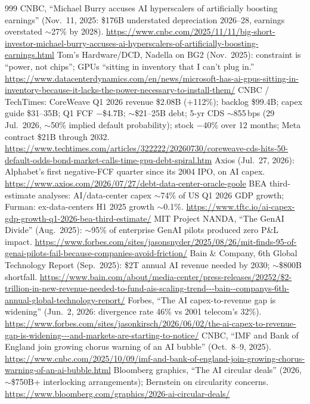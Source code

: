 \begin{thebibliography}{999}
 CNBC, ``Michael Burry accuses AI hyperscalers of artificially boosting earnings'' (Nov.\ 11, 2025: \$176B understated depreciation 2026--28, earnings overstated $\sim$27\% by 2028). \url{https://www.cnbc.com/2025/11/11/big-short-investor-michael-burry-accuses-ai-hyperscalers-of-artificially-boosting-earnings.html}
 Tom's Hardware/DCD, Nadella on BG2 (Nov.\ 2025): constraint is ``power, not chips''; GPUs ``sitting in inventory that I can't plug in.'' \url{https://www.datacenterdynamics.com/en/news/microsoft-has-ai-gpus-sitting-in-inventory-because-it-lacks-the-power-necessary-to-install-them/}
 CNBC / TechTimes: CoreWeave Q1 2026 revenue \$2.08B ($+$112\%); backlog \$99.4B; capex guide \$31--35B; Q1 FCF $-$\$4.7B; $\sim$\$21--25B debt; 5-yr CDS $\sim$855\,bps (29 Jul.\ 2026, $\sim$50\% implied default probability); stock $-$40\% over 12 months; Meta contract \$21B through 2032. \url{https://www.techtimes.com/articles/322222/20260730/coreweave-cds-hits-50-default-odds-bond-market-calls-time-gpu-debt-spiral.htm}
 Axios (Jul.\ 27, 2026): Alphabet's first negative-FCF quarter since its 2004 IPO, on AI capex. \url{https://www.axios.com/2026/07/27/debt-data-center-oracle-goole}
 BEA third-estimate analyses: AI/data-center capex $\sim$74\% of US Q1 2026 GDP growth; Furman: ex-data-centers H1 2025 growth $\sim$0.1\%. \url{https://www.tftc.io/ai-capex-gdp-growth-q1-2026-bea-third-estimate/}
 MIT Project NANDA, ``The GenAI Divide'' (Aug.\ 2025): $\sim$95\% of enterprise GenAI pilots produced zero P\&L impact. \url{https://www.forbes.com/sites/jasonsnyder/2025/08/26/mit-finds-95-of-genai-pilots-fail-because-companies-avoid-friction/}
 Bain \& Company, 6th Global Technology Report (Sep.\ 2025): \$2T annual AI revenue needed by 2030; $\sim$\$800B shortfall. \url{https://www.bain.com/about/media-center/press-releases/20252/$2-trillion-in-new-revenue-needed-to-fund-ais-scaling-trend---bain--companys-6th-annual-global-technology-report/}
 Forbes, ``The AI capex-to-revenue gap is widening'' (Jun.\ 2, 2026: divergence rate 46\% vs 2001 telecom's 32\%). \url{https://www.forbes.com/sites/jasonkirsch/2026/06/02/the-ai-capex-to-revenue-gap-is-widening---and-markets-are-starting-to-notice/}
 CNBC, ``IMF and Bank of England join growing chorus warning of an AI bubble'' (Oct.\ 8--9, 2025). \url{https://www.cnbc.com/2025/10/09/imf-and-bank-of-england-join-growing-chorus-warning-of-an-ai-bubble.html}
 Bloomberg graphics, ``The AI circular deals'' (2026, $\sim$\$750B+ interlocking arrangements); Bernstein on circularity concerns. \url{https://www.bloomberg.com/graphics/2026-ai-circular-deals/}

\end{thebibliography}
